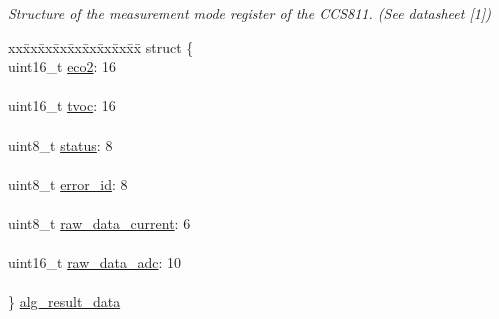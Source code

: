 \begin{DoxyCompactItemize}
\begin{tabbing}
\end{tabbing}\begin{DoxyCompactList}\small\item\em Structure of the measurement mode register of the C\+C\+S811. (See datasheet \mbox{[}1\mbox{]}) \end{DoxyCompactList}\item 
\begin{tabbing}
xx\=xx\=xx\=xx\=xx\=xx\=xx\=xx\=xx\=\kill
struct \{\\
\>uint16\_t \mbox{\hyperlink{union_application_register_a6ae8195dcd841d5d5a27361dbe594a5d}{eco2}}: 16\\
\>\\
\>uint16\_t \mbox{\hyperlink{union_application_register_a26fd892e05117ff980a779acfac83982}{tvoc}}: 16\\
\>\\
\>uint8\_t \mbox{\hyperlink{union_application_register_ade818037fd6c985038ff29656089758d}{status}}: 8\\
\>\\
\>uint8\_t \mbox{\hyperlink{union_application_register_ae43c81687ca2bd1e128a57d78959ae15}{error\_id}}: 8\\
\>\\
\>uint8\_t \mbox{\hyperlink{union_application_register_a7a36a66e5a41b8a2b261f9fa8c23deb4}{raw\_data\_current}}: 6\\
\>\\
\>uint16\_t \mbox{\hyperlink{union_application_register_af2995a35bf1791d033118b3e44cdcc44}{raw\_data\_adc}}: 10\\
\>\\
\} \mbox{\hyperlink{union_application_register_a7f04a5353de79353be8ea73375a88cdd}{alg\_result\_data}}\\


\end{tabbing}
\end{DoxyCompactItemize}
